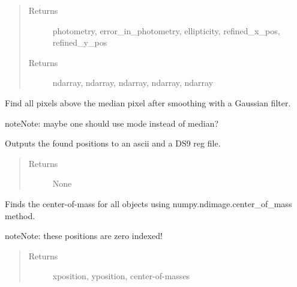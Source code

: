 \documentclass[a4paper,12pt,english]{sphinxmanual}
\begin{document}
\begin{fulllineitems}
\begin{fulllineitems}
\begin{quote}
\begin{description}
\item[{Returns}] \leavevmode
photometry, error\_in\_photometry, ellipticity, refined\_x\_pos, refined\_y\_pos

\item[{Returns}] \leavevmode
ndarray, ndarray, ndarray, ndarray, ndarray

\end{description}\end{quote}

\end{fulllineitems}


\begin{fulllineitems}
\label{analysis:analysis.sourceFinder.sourceFinder.find}
Find all pixels above the median pixel after smoothing with a Gaussian filter.

\begin{notice}{note}{Note:}
maybe one should use mode instead of median?
\end{notice}

\end{fulllineitems}


\begin{fulllineitems}
\label{analysis:analysis.sourceFinder.sourceFinder.generateOutput}
Outputs the found positions to an ascii and a DS9 reg file.
\begin{quote}\begin{description}
\item[{Returns}] \leavevmode
None

\end{description}\end{quote}

\end{fulllineitems}


\begin{fulllineitems}
\label{analysis:analysis.sourceFinder.sourceFinder.getCenterOfMass}
Finds the center-of-mass for all objects using numpy.ndimage.center\_of\_mass method.

\begin{notice}{note}{Note:}
these positions are zero indexed!
\end{notice}
\begin{quote}\begin{description}
\item[{Returns}] \leavevmode
xposition, yposition, center-of-masses


\end{description}
\end{quote}
\end{fulllineitems}
\end{fulllineitems}
\end{document}
